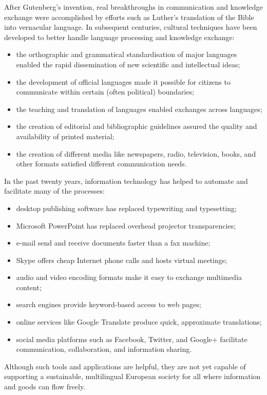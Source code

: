 \documentclass{scrartcl}
\begin{document}
\begin{Parallel}[c]{70mm}{70mm}
{    After Gutenberg’s invention, real breakthroughs in communication and knowledge exchange were accomplished by efforts such as Luther's translation of the Bible into vernacular language. In subsequent centuries, cultural techniques have been developed to better handle language processing and knowledge exchange:
    \begin{itemize}
      \item the orthographic and grammatical standardisation of major languages enabled the rapid dissemination of new
      scientific and intellectual ideas;
      \item the development of official languages made it possible for citizens to communicate within certain (often
      political) boundaries;
      \item the teaching and translation of languages enabled exchanges across languages;
      \item the creation of editorial and bibliographic guidelines assured the quality and availability of printed
      material;
      \item the creation of different media like newspapers, radio, television, books, and other formats satisfied
      different communication needs.
    \end{itemize}
    In the past twenty years, information technology has helped to automate and facilitate many of the processes:
    \begin{itemize}
      \item desktop publishing software has replaced typewriting and typesetting;
      \item Microsoft PowerPoint has replaced overhead projector transparencies;
      \item e-mail send and receive documents faster than a fax machine;
      \item Skype offers cheap Internet phone calls and hosts virtual meetings;
      \item audio and video encoding formats make it easy to exchange multimedia content;
      \item search engines provide keyword-based access to web pages;
      \item online services like Google Translate produce quick, approximate translations;
      \item social media platforms such as Facebook, Twitter, and Google+ facilitate communication, collaboration, and information sharing.
    \end{itemize}
    Although such tools and applications are helpful, they are not yet capable of supporting a sustainable, multilingual European society for all where information and goods can flow freely.
  }
  \ParallelPar



\end{Parallel}
\end{document}
